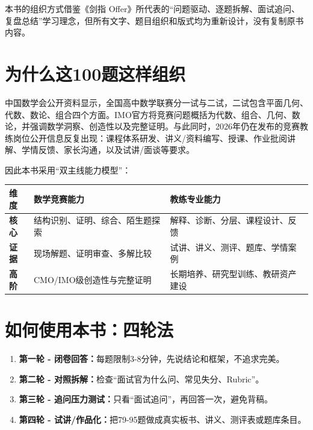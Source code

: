 \documentclass[11pt,openany]{ctexbook}
\begin{document}
本书的组织方式借鉴《剑指 Offer》所代表的“问题驱动、逐题拆解、面试追问、复盘总结”学习理念，但所有文字、题目组织和版式均为重新设计，没有复制原书内容。

\chapter*{为什么这100题这样组织}
中国数学会公开资料显示，全国高中数学联赛分一试与二试，二试包含平面几何、代数、数论、组合四个方面。IMO官方将竞赛问题概括为代数、组合、几何、数论，并强调数学洞察、创造性以及完整证明。与此同时，2026年仍在发布的竞赛教练岗位公开信息反复出现：课程体系研发、讲义/资料编写、授课、作业批阅讲解、学情反馈、家长沟通，以及试讲/面谈等要求。

因此本书采用“双主线能力模型”：
\begin{center}
\end{center}

\begin{tabularx}{\textwidth}{>{\bfseries}p{30mm}X X}
\toprule
维度 & 数学竞赛能力 & 教练专业能力\\
\midrule
核心 & 结构识别、证明、综合、陌生题探索 & 解释、诊断、分层、课程设计、反馈\\
证据 & 现场解题、证明审查、多解比较 & 试讲、讲义、测评、题库、学情案例\\
高阶 & CMO/IMO级创造性与完整证明 & 长期培养、研究型训练、教研资产建设\\
\bottomrule
\end{tabularx}

\chapter*{如何使用本书：四轮法}
\begin{enumerate}
\item \textbf{第一轮 - 闭卷回答：}每题限制3-8分钟，先说结论和框架，不追求完美。
\item \textbf{第二轮 - 对照拆解：}检查“面试官为什么问、常见失分、Rubric”。
\item \textbf{第三轮 - 追问压力测试：}只看“面试追问”，再回答一次，避免背稿。
\item \textbf{第四轮 - 试讲/作品化：}把79-95题做成真实板书、讲义、测评表或题库条目。
\end{enumerate}
\end{document}
